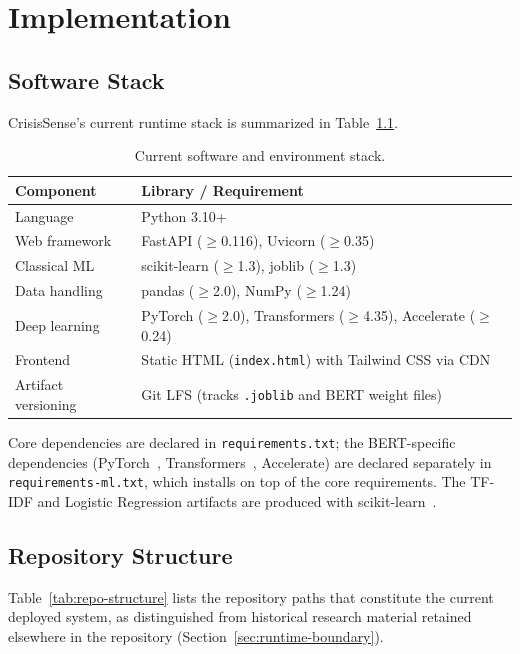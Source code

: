 \chapter{Implementation}

\section{Software Stack}

CrisisSense's current runtime stack is summarized in Table~\ref{tab:software-stack}.

\begin{table}[H]
\centering
\caption{Current software and environment stack.}
\label{tab:software-stack}
\begin{tabular}{ll}
\toprule
\textbf{Component} & \textbf{Library / Requirement} \\
\midrule
Language & Python 3.10+ \\
Web framework & FastAPI ($\geq$0.116), Uvicorn ($\geq$0.35) \\
Classical ML & scikit-learn ($\geq$1.3), joblib ($\geq$1.3) \\
Data handling & pandas ($\geq$2.0), NumPy ($\geq$1.24) \\
Deep learning & PyTorch ($\geq$2.0), Transformers ($\geq$4.35), Accelerate ($\geq$0.24) \\
Frontend & Static HTML (\texttt{index.html}) with Tailwind CSS via CDN \\
Artifact versioning & Git LFS (tracks \texttt{.joblib} and BERT weight files) \\
\bottomrule
\end{tabular}
\end{table}

Core dependencies are declared in \texttt{requirements.txt}; the BERT-specific dependencies (PyTorch~\cite{paszke2019pytorch}, Transformers~\cite{wolf2020transformers}, Accelerate) are declared separately in \texttt{requirements-ml.txt}, which installs on top of the core requirements. The TF-IDF and Logistic Regression artifacts are produced with scikit-learn~\cite{pedregosa2011scikit}.

\section{Repository Structure}

Table~\ref{tab:repo-structure} lists the repository paths that constitute the current deployed system, as distinguished from historical research material retained elsewhere in the repository (Section~\ref{sec:runtime-boundary}).

